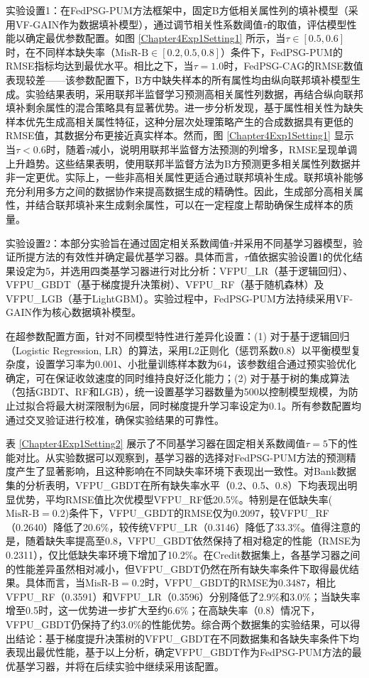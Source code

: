 实验设置1：在FedPSG-PUM方法框架中，固定B方低相关属性列的填补模型（采用VF-GAIN作为数据填补模型），通过调节相关性系数阈值$\tau$的取值，评估模型性能以确定最优参数配置。如图 \ref{Chapter4Exp1Setting1} 所示，当$\tau \in [0.5,0.6]$时，在不同样本缺失率（$\text{MisR-B} \in [0.2,0.5,0.8]$）条件下，FedPSG-PUM的RMSE指标均达到最优水平。相比之下，当$\tau = 1.0$时，FedPSG-CAG的RMSE数值表现较差——该参数配置下，B方中缺失样本的所有属性均由纵向联邦填补模型生成。实验结果表明，采用联邦半监督学习预测高相关属性列数据，再结合纵向联邦填补剩余属性的混合策略具有显著优势。进一步分析发现，基于属性相关性为缺失样本优先生成高相关属性特征，这种分层次处理策略产生的合成数据具有更低的RMSE值，其数据分布更接近真实样本。然而，图 \ref{Chapter4Exp1Setting1} 显示当$\tau < 0.6 $时，随着$\tau$减小，说明用联邦半监督方法预测的列增多，RMSE呈现单调上升趋势。这些结果表明，使用联邦半监督方法为B方预测更多相关属性列数据并非一定更优。实际上，一些非高相关属性更适合通过联邦填补生成。联邦填补能够充分利用多方之间的数据协作来提高数据生成的精确性。因此，生成部分高相关属性，并结合联邦填补来生成剩余属性，可以在一定程度上帮助确保生成样本的质量。

实验设置2：本部分实验旨在通过固定相关系数阈值$\tau$并采用不同基学习器模型，验证所提方法的有效性并确定最优基学习器。具体而言，$\tau$值依据实验设置1的优化结果设定为5，并选用四类基学习器进行对比分析：VFPU\_LR（基于逻辑回归）、VFPU\_GBDT（基于梯度提升决策树）、VFPU\_RF（基于随机森林）及VFPU\_LGB（基于LightGBM）。实验过程中，FedPSG-PUM方法持续采用VF-GAIN作为核心数据填补模型。

在超参数配置方面，针对不同模型特性进行差异化设置：(1) 对于基于逻辑回归（Logistic Regression, LR）的算法，采用L2正则化（惩罚系数0.8）以平衡模型复杂度，设置学习率为0.001、小批量训练样本数为64，该参数组合通过预实验优化确定，可在保证收敛速度的同时维持良好泛化能力；(2) 对于基于树的集成算法（包括GBDT、RF和LGB），统一设置基学习器数量为500以控制模型规模，为防止过拟合将最大树深限制为6层，同时梯度提升学习率设定为0.1。所有参数配置均通过交叉验证进行校准，确保实验结果的可靠性。

表 \ref{Chapter4Exp1Setting2} 展示了不同基学习器在固定相关系数阈值$\tau=5$下的性能对比。从实验数据可以观察到，基学习器的选择对FedPSG-PUM方法的预测精度产生了显著影响，且这种影响在不同缺失率环境下表现出一致性。对Bank数据集的分析表明，VFPU\_GBDT在所有缺失率水平（0.2、0.5、0.8）下均表现出明显优势，平均RMSE值比次优模型VFPU\_RF低20.5\%。特别是在低缺失率($\text{MisR-B}=0.2$)条件下，VFPU\_GBDT的RMSE仅为0.2097，较VFPU\_RF（0.2640）降低了20.6\%，较传统VFPU\_LR（0.3146）降低了33.3\%。值得注意的是，随着缺失率提高至0.8，VFPU\_GBDT依然保持了相对稳定的性能（RMSE为0.2311），仅比低缺失率环境下增加了10.2\%。在Credit数据集上，各基学习器之间的性能差异虽然相对减小，但VFPU\_GBDT仍然在所有缺失率条件下取得最优结果。具体而言，当$\text{MisR-B}=0.2$时，VFPU\_GBDT的RMSE为0.3487，相比VFPU\_RF（0.3591）和VFPU\_LR（0.3596）分别降低了2.9\%和3.0\%；当缺失率增至0.5时，这一优势进一步扩大至约6.6\%；在高缺失率（0.8）情况下，VFPU\_GBDT仍保持了约3.0\%的性能优势。综合两个数据集的实验结果，可以得出结论：基于梯度提升决策树的VFPU\_GBDT在不同数据集和各缺失率条件下均表现出最优性能，基于以上分析，确定VFPU\_GBDT作为FedPSG-PUM方法的最优基学习器，并将在后续实验中继续采用该配置。


